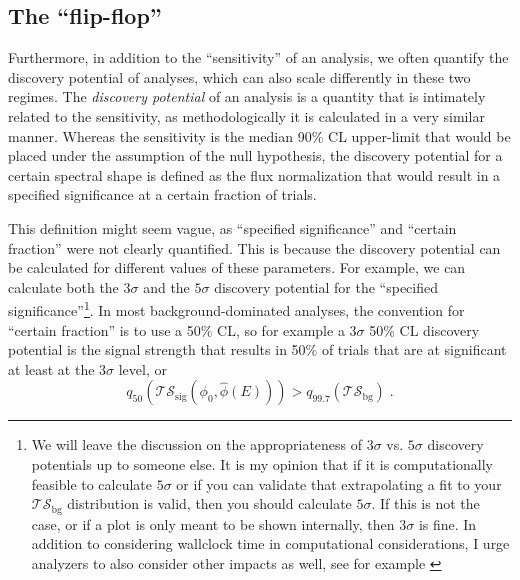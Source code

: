 \documentclass[a4paper,11pt]{article}
\newcommand\ts{\mathcal{TS}}
\newcommand\tsbg{\mathcal{TS_{\mathrm{bg}}}}
\begin{document}
\subsection{The ``flip-flop''}
Furthermore, in addition to the ``sensitivity'' of an analysis, we often quantify the discovery potential of analyses, which can also scale differently in these two regimes. The \textit{discovery potential} of an analysis is a quantity that is intimately related to the sensitivity, as methodologically it is calculated in a very similar manner. Whereas the sensitivity is the median 90\% CL upper-limit that would be placed under the assumption of the null hypothesis, the discovery potential for a certain spectral shape is defined as the flux normalization that would result in a specified significance at a certain fraction of trials.

This definition might seem vague, as ``specified significance'' and ``certain fraction'' were not clearly quantified. This is because the discovery potential can be calculated for different values of these parameters. For example, we can calculate both the $3\sigma$ and the $5\sigma$ discovery potential for the ``specified significance''\footnote{We will leave the discussion on the appropriateness of $3\sigma$ vs. $5\sigma$ discovery potentials up to someone else. It is my opinion that if it is computationally feasible to calculate $5\sigma$ or if you can validate that extrapolating a fit to your $\tsbg$ distribution is valid, then you should calculate $5\sigma$. If this is not the case, or if a plot is only meant to be shown internally, then $3\sigma$ is fine. In addition to considering wallclock time in computational considerations, I urge analyzers to also consider other impacts as well, see for example \cite{PortegiesZwart:2020pdu}}. In most background-dominated analyses, the convention for ``certain fraction'' is to use a 50\% CL, so for example a $3\sigma$ 50\% CL discovery potential is the signal strength that results in 50\% of trials that are at significant at least at the $3\sigma$ level, or
\begin{equation}
    q_{50}(\ts_{\mathrm{sig}}(\phi_0, \hat{\phi}(E))) > q_{99.7}(\tsbg) \; . 
\end{equation}
\end{document}
